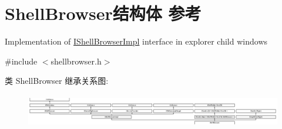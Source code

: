 \hypertarget{struct_shell_browser}{}\section{Shell\+Browser结构体 参考}
\label{struct_shell_browser}


Implementation of \hyperlink{struct_i_shell_browser_impl}{I\+Shell\+Browser\+Impl} interface in explorer child windows  




{\ttfamily \#include $<$shellbrowser.\+h$>$}

类 Shell\+Browser 继承关系图\+:\begin{figure}[H]
\begin{center}
\leavevmode
\includegraphics[height=1.472135cm]{struct_shell_browser}
\end{center}
\end{figure}

